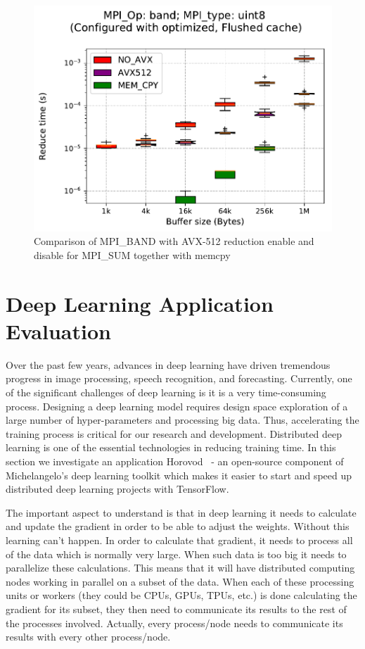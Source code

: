 \documentclass[sigconf,review]{acmart}
\begin{document}
\begin{figure}[h]
    \centering
    \includegraphics[trim={0 0 0 1.5cm},clip,width=\linewidth]{avx_band.pdf}
    \caption{Comparison of MPI\_BAND with AVX-512 reduction enable and disable for MPI\_SUM together with memcpy}
    \label{fig:avx_band}
\end{figure}

\section{Deep Learning Application Evaluation}\label{sec:application}
Over the past few years, advances in deep learning have driven tremendous progress in image
processing, speech recognition, and forecasting. Currently, one of the significant challenges
of deep learning is it is a very time-consuming process. Designing a deep learning model
requires design space exploration of a large number of hyper-parameters and processing big data.
Thus, accelerating the training process is critical for our research and development.
Distributed deep learning is one of the essential technologies in reducing training time.
In this section we investigate an application Horovod~\cite{sergeev2018horovod} - an open-source component of Michelangelo's deep learning toolkit which makes it easier to start and speed
up distributed deep learning projects with TensorFlow.

The important aspect to understand is that in deep learning it needs to calculate and update the gradient
in order to be able to adjust the weights. Without this learning can't happen. In order to calculate that gradient, it needs to process all of the data which is normally very large. When such data is too big it needs to parallelize these calculations. This means that it will have distributed computing nodes working in parallel on a subset of the data. When each of these processing units or workers (they could be CPUs, GPUs, TPUs, etc.) is done calculating the gradient for its subset, they then need to communicate its results to the rest of the processes involved. Actually, every process/node needs to communicate its results with every other process/node.
\end{document}
